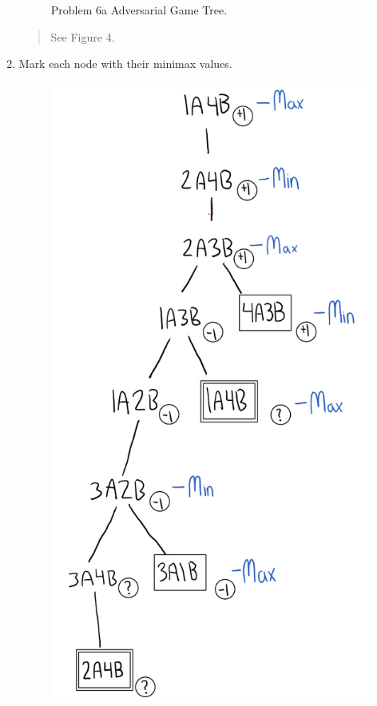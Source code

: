 \documentclass[11pt]{article}
\newenvironment{problem}[2][Problem]{\begin{trivlist}
\item[\hskip \labelsep {\bfseries #1}\hskip \labelsep {\bfseries #2.}]}{\end{trivlist}}
\begin{document}
\begin{problem}{6}
\begin{enumerate}
\begin{figure}
			\caption{Problem 6a Adversarial Game Tree.}
			\label{fig.bfs}
		\end{figure}
		\begin{verse}
			See Figure 4.
		\end{verse}
	\item Mark each node with their minimax values.
		\begin{figure}
			\includegraphics[scale=1]{cse545_hw2_p6_b.PNG}

\end{figure}
\end{enumerate}
\end{problem}
\end{document}
